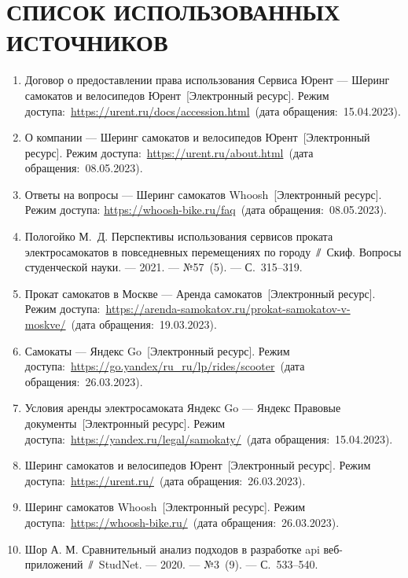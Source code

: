 \chapter*{СПИСОК ИСПОЛЬЗОВАННЫХ ИСТОЧНИКОВ}

\begin{enumerate}
    \item \label{urent-reqs} Договор о предоставлении права использования Сервиса Юрент --- Шеринг самокатов и велосипедов Юрент~[Электронный ресурс]. Режим доступа:~\url{https://urent.ru/docs/accession.html}~(дата обращения:~15.04.2023).
    \item \label{urent-cities} О компании --- Шеринг самокатов и велосипедов Юрент~[Электронный ресурс]. Режим доступа:~\url{https://urent.ru/about.html}~(дата обращения:~08.05.2023).
    \item \label{whoosh-reqs} Ответы на вопросы --- Шеринг самокатов Whoosh~[Электронный ресурс]. Режим доступа: \url{https://whoosh-bike.ru/faq}~(дата обращения:~08.05.2023).
    \item \label{popularity} Пологойко М.~Д. Перспективы использования сервисов проката электросамокатов в повседневных перемещениях по городу~$\sslash$~Скиф. Вопросы студенческой науки. --- 2021. --- №57~(5). --- С.~315--319.
    \item \label{hype} Прокат самокатов в Москве --- Аренда самокатов~[Электронный ресурс]. Режим доступа:~\url{https://arenda-samokatov.ru/prokat-samokatov-v-moskve/}~(дата обращения:~19.03.2023).
    \item \label{yago} Самокаты --- Яндекс Go~[Электронный ресурс]. Режим доступа:~\url{https://go.yandex/ru_ru/lp/rides/scooter}~(дата обращения:~26.03.2023).
    \item \label{yago-reqs} Условия аренды электросамоката Яндекс Go --- Яндекс Правовые документы~[Электронный ресурс]. Режим доступа:~\url{https://yandex.ru/legal/samokaty/}~(дата обращения:~15.04.2023).
    \item \label{urent} Шеринг самокатов и велосипедов Юрент~[Электронный ресурс]. Режим доступа:~\url{https://urent.ru/}~(дата обращения:~26.03.2023).
    \item \label{whoosh} Шеринг самокатов Whoosh~[Электронный ресурс]. Режим доступа:~\url{https://whoosh-bike.ru/}~(дата обращения:~26.03.2023).
    \item \label{rest} Шор А. М. Сравнительный анализ подходов в разработке api веб-приложений~$\sslash$~StudNet. --- 2020. --- №3~(9). --- С.~533--540.

\end{enumerate}
